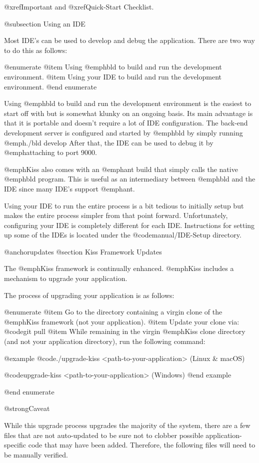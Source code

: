 @xref{Important} and @xref{Quick-Start Checklist}.

@subsection Using an IDE

Most IDE's can be used to develop and debug the application.  There are two
way to do this as follows:

@enumerate
@item
Using @emph{bld} to build and run the development environment.
@item
Using your IDE to build and run the development environment.
@end enumerate

Using @emph{bld} to build and run the development environment is the
easiest to start off with but is somewhat klunky on an ongoing basis.
Its main advantage is that it is portable and doesn't require a lot of
IDE configuration.  The back-end development server is configured and
started by @emph{bld} by simply running @emph{./bld develop} After
that, the IDE can be used to debug it by @emph{attaching} to port
9000.

@emph{Kiss} also comes with an @emph{ant} build that simply calls the
native @emph{bld} program.  This is useful as an intermediary between
@emph{bld} and the IDE since many IDE's support @emph{ant}.

Using your IDE to run the entire process is a bit tedious to initially
setup but makes the entire process simpler from that point forward.
Unfortunately, configuring your IDE is completely different for each
IDE.  Instructions for setting up some of the IDEs is located under the
@code{manual/IDE-Setup} directory.


@anchor{updates} @section Kiss Framework Updates

The @emph{Kiss} framework is continually enhanced.  @emph{Kiss}
includes a mechanism to upgrade your application. 

The process of upgrading your application is as follows:

@enumerate
@item
Go to the directory containing a virgin clone of the @emph{Kiss} framework (not your application).
@item
Update your clone via: @code{git pull}
@item
While remaining in the virgin @emph{Kiss} clone directory (and not your application directory),
run the following command:  

@example
@code{./upgrade-kiss <path-to-your-application>} (Linux & macOS)

@code{upgrade-kiss <path-to-your-application>} (Windows)
@end example

@end enumerate

@strong{Caveat}

While this upgrade process upgrades the majority of the system, there
are a few files that are not auto-updated to be sure not to clobber
possible application-specific code that may have been added.
Therefore, the following files will need to be manually verified.

